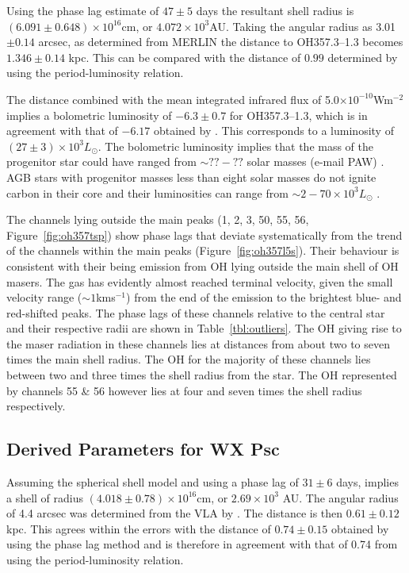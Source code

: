 \documentclass[usenatbib,usegraphicx]{mn2e}
\begin{document}
Using the phase lag estimate of $47\pm5$ days the resultant shell radius is
$(6.091\pm0.648)\times 10^{16}$cm, or $4.072\times 10^{3}$AU.  Taking the
angular radius as 3.01$\pm0.14$ arcsec, as determined from MERLIN
\citep{Shepherd91,Shepherd93} the distance to OH357.3--1.3 becomes
$1.346\pm0.14$ kpc.  This can be compared with the distance of $0.99$
determined by \citet{OliWhtlkMar01} using the period-luminosity relation.

The distance combined with the mean integrated infrared flux of 5.0$\times
10^{-10}$Wm$^{-2}$ implies a bolometric luminosity of $-6.3\pm0.7$ for
OH357.3--1.3, which is in agreement with that of $-6.17$ obtained by
\citet{OliWhtlkMar01}.  This corresponds to a luminosity of $(27\pm3)\times
10^{3} L_\odot$.  The bolometric luminosity implies that the mass of the
progenitor star could have ranged from $\sim??-??$ solar masses (e-mail PAW)
\citep{IbenRen83}.  AGB stars with progenitor masses less than eight solar
masses do not ignite carbon in their core and their luminosities can range
from $\sim2 - 70\times 10^{3} L_\odot$ \citep{IbenRen83}.

The channels lying outside the main peaks (1, 2, 3, 50, 55, 56,
Figure~\ref{fig:oh357tsp}) show phase lags that deviate systematically from
the trend of the channels within the main peaks (Figure~\ref{fig:oh357l5s}). 
Their behaviour is consistent with their being emission from OH lying
outside the main shell of OH masers.  The gas has evidently almost reached
terminal velocity, given the small velocity range ($\sim1$kms$^{-1}$) from
the end of the emission to the brightest blue- and red-shifted peaks. The
phase lags of these channels relative to the central star and their
respective radii are shown in Table~\ref{tbl:outliers}.  The OH giving rise
to the maser radiation in these channels lies at distances from about two to
seven times the main shell radius.  The OH for the majority of these
channels lies between two and three times the shell radius from the star. 
The OH represented by channels 55 \& 56 however lies at four and seven times
the shell radius respectively.


\subsection{Derived Parameters for WX Psc}

Assuming the spherical shell model and using a phase lag of $31\pm6$ days,
implies a shell of radius $(4.018\pm0.78)\times 10^{16}$cm, or
$2.69\times 10^3$ AU.  The angular radius of 4.4 arcsec was determined from
the VLA by \citet{BowJS83}.  The distance is then $0.61\pm0.12$ kpc.  This
agrees within the errors with the distance of $0.74\pm0.15$ obtained by
\citet{vLvdHvS90} using the phase lag method and is therefore in agreement
with that of 0.74 from \citet{OliWhtlkMar01} using the period-luminosity
relation.
\end{document}
